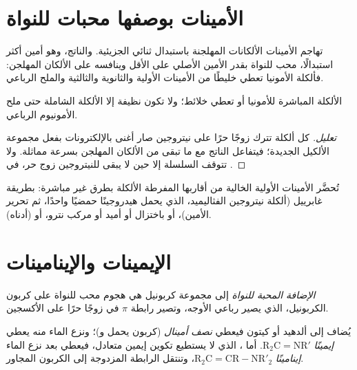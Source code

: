 \section{الأمينات بوصفها محبات للنواة}

تهاجم الأمينات الألكانات المهلجنة باستبدال ثنائي الجزيئية. والناتج، وهو أمين أكثر استبدالًا،
محب للنواة بقدر الأمين الأصلي على الأقل وينافسه على الألكان المهلجن:
فألكلة الأمونيا تعطي خليطًا من الأمينات الأولية والثانوية والثالثية والملح
الرباعي.

\begin{proposition}\label{prop:b2:amines:polyalkylation}
الألكلة المباشرة للأمونيا أو  تعطي خلائط؛ ولا تكون نظيفة إلا الألكلة الشاملة
حتى ملح الأمونيوم الرباعي.
\end{proposition}

\begin{proof}[تعليل]
كل ألكلة تترك زوجًا حرًا على نيتروجين صار أغنى بالإلكترونات بفعل مجموعة الألكيل
الجديدة؛ فيتفاعل الناتج مع ما تبقى من الألكان المهلجن بسرعة مماثلة. ولا تتوقف السلسلة
إلا حين لا يبقى للنيتروجين زوج حر، في .
\end{proof}

تُحضَّر الأمينات الأولية الخالية من أقاربها المفرطة الألكلة بطرق غير مباشرة: بطريقة
غابرييل (ألكلة نيتروجين الفثاليميد، الذي يحمل هيدروجينًا حمضيًا واحدًا، ثم
تحرير الأمين)، أو باختزال  أو أميد أو مركب نترو، أو  (أدناه).

\section{الإيمينات والإينامينات}

\begin{definition}\label{def:b2:amines:nucleophilic-addition}
\emph{الإضافة المحبة للنواة} إلى مجموعة كربونيل هي هجوم
محب للنواة على كربون الكربونيل، الذي يصير رباعي الأوجه، وتصير رابطة $\pi$ في 
زوجًا حرًا على الأكسجين.
\end{definition}

\begin{definition}\label{def:b2:amines:imine}
يُضاف  إلى ألدهيد أو كيتون فيعطي \emph{نصف أمينال}
(كربون يحمل  و)؛ ونزع الماء منه يعطي \emph{إيمينًا}
$\mathrm{R_2C{=}NR'}$. أما ، الذي لا يستطيع تكوين إيمين متعادل، فيعطي بعد نزع الماء
\emph{إينامينًا} $\mathrm{R_2C{=}CR{-}NR'_2}$، وتنتقل الرابطة المزدوجة إلى الكربون المجاور.
\end{definition}

